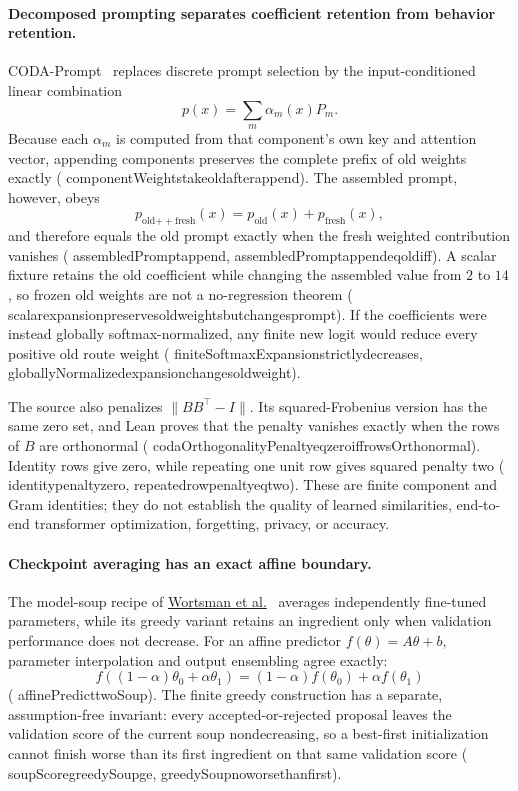 \documentclass[11pt]{article}
\newcommand{\leanname}[1]{{\scriptsize\ttfamily
  \def\_{\textunderscore\allowbreak}#1}}
\begin{document}
\paragraph{Decomposed prompting separates coefficient retention from behavior retention.}
CODA-Prompt~\cite{smith2023coda} replaces discrete prompt selection by the
input-conditioned linear combination
\[
 p(x)=\sum_m \alpha_m(x)P_m .
\]
Because each $\alpha_m$ is computed from that component's own key and
attention vector, appending components preserves the complete prefix of old
weights exactly
(\leanname{componentWeights\_take\_old\_after\_append}).  The assembled prompt,
however, obeys
\[
 p_{\mathrm{old}\mathbin{+\!\!+}\mathrm{fresh}}(x)
 =p_{\mathrm{old}}(x)+p_{\mathrm{fresh}}(x),
\]
and therefore equals the old prompt exactly when the fresh weighted
contribution vanishes
(\leanname{assembledPrompt\_append},
\leanname{assembledPrompt\_append\_eq\_old\_iff}).  A scalar fixture retains
the old coefficient while changing the assembled value from $2$ to $14$,
so frozen old weights are not a no-regression theorem
(\leanname{scalar\_expansion\_preserves\_old\_weights\_but\_changes\_prompt}).
If the coefficients were instead globally softmax-normalized, any finite
new logit would reduce every positive old route weight
(\leanname{finiteSoftmaxExpansion\_strictly\_decreases},
\leanname{globallyNormalized\_expansion\_changes\_old\_weight}).

The source also penalizes $\lVert BB^\top-I\rVert$.  Its squared-Frobenius
version has the same zero set, and Lean proves that the penalty vanishes
exactly when the rows of $B$ are orthonormal
(\leanname{codaOrthogonalityPenalty\_eq\_zero\_iff\_rowsOrthonormal}).
Identity rows give zero, while repeating one unit row gives squared penalty
two
(\leanname{identity\_penalty\_zero},
\leanname{repeated\_row\_penalty\_eq\_two}).
These are finite component and Gram identities; they do not establish the
quality of learned similarities, end-to-end transformer optimization,
forgetting, privacy, or accuracy.

\paragraph{Checkpoint averaging has an exact affine boundary.}
The model-soup recipe of
\href{https://arxiv.org/abs/2203.05482}{Wortsman et
al.}~\cite{wortsman2022soups} averages independently fine-tuned parameters,
while its greedy variant retains an ingredient only when validation
performance does not decrease. For an affine predictor
$f(\theta)=A\theta+b$, parameter interpolation and output ensembling agree
exactly:
\[
 f((1-\alpha)\theta_0+\alpha\theta_1)
 =(1-\alpha)f(\theta_0)+\alpha f(\theta_1)
\]
(\leanname{affinePredict\_twoSoup}). The finite greedy construction has a
separate, assumption-free invariant: every accepted-or-rejected proposal
leaves the validation score of the current soup nondecreasing, so a
best-first initialization cannot finish worse than its first ingredient on
that same validation score
(\leanname{soupScore\_greedySoup\_ge},
\leanname{greedySoup\_no\_worse\_than\_first}).
\end{document}
